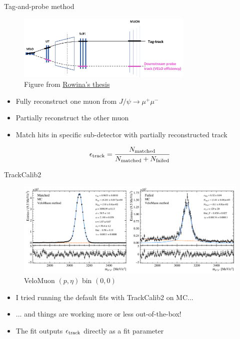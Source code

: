 \documentclass[xcolor={dvipsnames}]{beamer}
\begin{document}
\begin{frame}{Tag-and-probe method}
  \vspace{0.0cm}
  \begin{figure}[htb]
    \centering
    \includegraphics[width=0.75\textwidth]{Plots/Tag_and_probe_method.png}
    \caption*{\small Figure from \href{https://www.physi.uni-heidelberg.de/Publications/PhD_thesis.pdf}{Rowina's thesis}}
  \end{figure}
  \begin{itemize}
    \item{Fully reconstruct one muon from $J/\psi\to\mu^+\mu^-$}
    \item{Partially reconstruct the other muon}
    \item{Match hits in specific sub-detector with partially reconstructed track}
  \end{itemize}
  \begin{equation*}
    \epsilon_{\rm track} = \frac{N_{\rm matched}}{N_{\rm matched} + N_{\rm failed}}
  \end{equation*}
\end{frame}

\begin{frame}{TrackCalib2}
  \vspace{0.0cm}
  \begin{figure}[htb]
    \centering
    \includegraphics[width=1.0\textwidth]{Plots/MC_VeloMuon_P_bin_0_ETA_bin_0_sim.pdf}
    \caption*{\small VeloMuon $(p, \eta)$ bin $(0, 0)$}
  \end{figure}
  \vspace{-0.5cm}
  \begin{itemize}
    \item{I tried running the default fits with TrackCalib2 on MC...}
    \item{... and things are working more or less out-of-the-box!}
    \item{The fit outputs $\epsilon_{\rm track}$ directly as a fit parameter}
  \end{itemize}
\end{frame}
\end{document}
